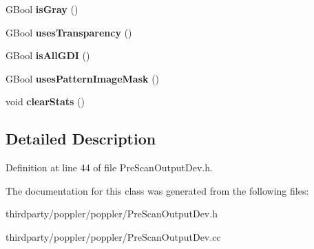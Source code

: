 \begin{DoxyCompactItemize}
\item 
\mbox{\label{class_pre_scan_output_dev_a4aa51b02cabfd96b9badc2772a57f9f4}} 
G\+Bool {\bfseries is\+Gray} ()
\item 
\mbox{\label{class_pre_scan_output_dev_af84265e2c88e98f19926620701f0aea6}} 
G\+Bool {\bfseries uses\+Transparency} ()
\item 
\mbox{\label{class_pre_scan_output_dev_a5ee31459003c7b77e0ceb2104d9dde76}} 
G\+Bool {\bfseries is\+All\+G\+DI} ()
\item 
\mbox{\label{class_pre_scan_output_dev_acc37eb0b0bb1f3a8ee3cf7cb7eaea19b}} 
G\+Bool {\bfseries uses\+Pattern\+Image\+Mask} ()
\item 
\mbox{\label{class_pre_scan_output_dev_a4af48014a408bc1032f4a0bc0916adfa}} 
void {\bfseries clear\+Stats} ()
\end{DoxyCompactItemize}


\subsection{Detailed Description}


Definition at line 44 of file Pre\+Scan\+Output\+Dev.\+h.



The documentation for this class was generated from the following files\+:\begin{DoxyCompactItemize}
\item 
thirdparty/poppler/poppler/Pre\+Scan\+Output\+Dev.\+h\item 
thirdparty/poppler/poppler/Pre\+Scan\+Output\+Dev.\+cc\end{DoxyCompactItemize}

